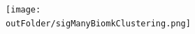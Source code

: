 \documentclass[8pt,xcolor=table]{beamer}
\begin{document}
\begin{frame}
\begin{columns}[T]
\begin{column}{.7\textwidth}
\begin{itemize}
  \end{itemize}
     

    \end{column}
    \begin{column}{.3\textwidth}

    
       
    \begin{figure}
    \centering
    \texttt{[image: \\outFolder/sigManyBiomkClustering.png]}
    \end{figure}
    

    \end{column}
  \end{columns}
  
% 
%   


\end{frame}


\end{document}
